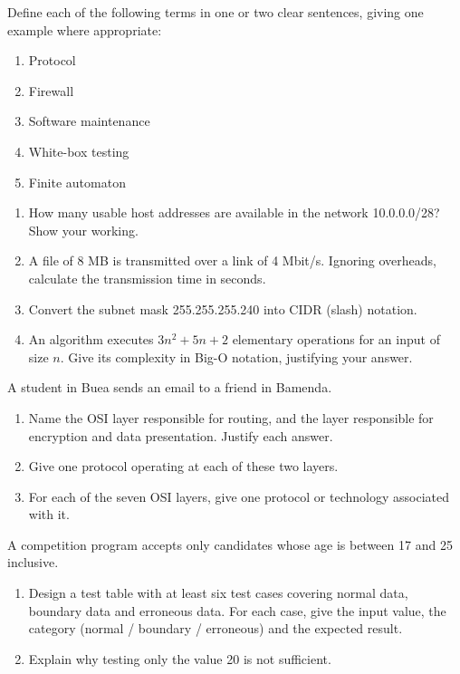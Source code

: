 \documentclass[11pt]{article}
\newcounter{popsec}
\newcounter{popsub}
\newcommand{\courssub}[1]{%
  \stepcounter{popsub}%
  \par\vspace{9pt}\noindent{\popxbold\fontsize{11.5}{13}\selectfont\color{popink}{\color{poporange}\thepopsec.\thepopsub}\hspace{6pt}#1}\par\nopagebreak\vspace{4pt}
}
\begin{document}
\begin{exercice}[Definitions]
Define each of the following terms in one or two clear sentences, giving one example where appropriate:
\begin{enumerate}
\item Protocol
\item Firewall
\item Software maintenance
\item White-box testing
\item Finite automaton
\end{enumerate}
\end{exercice}

\begin{exercice}
\begin{enumerate}
\item How many usable host addresses are available in the network 10.0.0.0/28? Show your working.
\item A file of 8 MB is transmitted over a link of 4 Mbit/s. Ignoring overheads, calculate the transmission time in seconds.
\item Convert the subnet mask 255.255.255.240 into CIDR (slash) notation.
\item An algorithm executes $3n^2 + 5n + 2$ elementary operations for an input of size $n$. Give its complexity in Big-O notation, justifying your answer.
\end{enumerate}
\end{exercice}

\courssub{I practise}

\begin{exercice}
A student in Buea sends an email to a friend in Bamenda.
\begin{enumerate}
\item Name the OSI layer responsible for routing, and the layer responsible for encryption and data presentation. Justify each answer.
\item Give one protocol operating at each of these two layers.
\item For each of the seven OSI layers, give one protocol or technology associated with it.
\end{enumerate}
\end{exercice}

\begin{exercice}
A competition program accepts only candidates whose age is between 17 and 25 inclusive.
\begin{enumerate}
\item Design a test table with at least six test cases covering normal data, boundary data and erroneous data. For each case, give the input value, the category (normal / boundary / erroneous) and the expected result.
\item Explain why testing only the value 20 is not sufficient.
\end{enumerate}
\end{exercice}
\end{document}
